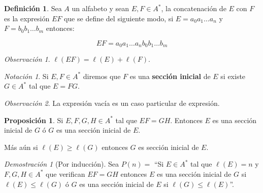 \documentclass[a4paper,11pt]{article}
\theoremstyle{definition}
\newtheorem{defn}{Definición}[section]
\newtheorem{prop}{Proposición}[section]
\theoremstyle{remark}
\newtheorem*{remk}{Observación}
\newtheorem*{notc}{Notación}
\newtheorem*{demo}{Demostración}
\begin{document}
\begin{defn}
Sea $A$ un alfabeto y sean $E, F \in A^*$, la concatenación 
de $E$ con $F$ es la expresión $EF$ que se define del siguiente modo, 
si $E = a_0a_1\dots a_n$ y $F = b_0b_1\dots b_m$ entonces:

\[ EF = a_0a_1\dots a_nb_0b_1\dots b_m \]
\end{defn}

\begin{remk}
$\ell(EF) = \ell(E) + \ell(F)$.
\end{remk}

\begin{notc}
Si $E,F \in A^*$ diremos que $F$ es una \textbf{sección inicial} de $E$ si
existe $G \in A^*$ tal que $E = FG$.
\end{notc}

\begin{remk}
La expresión vacía es un caso particular de expresión.
\end{remk}

\begin{prop}
Si $E, F, G, H \in A^*$ tal que $EF = GH$. Entonces $E$
es una sección inicial de $G$ ó $G$ es una sección inicial de $E$.

Más aún si $\ell(E) \ge \ell(G)$ entonces $G$ es sección inicial de $E$.
\end{prop}

\begin{demo}[Por inducción]
Sea $P(n) =$  ``Si $E \in A^*$ tal que $\ell(E) = n$ y $F, G, H \in A^*$
que verifican $EF = GH$ entonces $E$ es una sección inicial de $G$ si 
$\ell(E) \le \ell(G)$ ó $G$ es una sección inicial de $E$ si 
$\ell(G) \le \ell(E)$''.
\end{demo}
\end{document}
